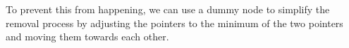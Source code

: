 \documentclass[preview]{standalone}
\begin{document}
To prevent this from happening, we can use a dummy node to simplify the removal process by adjusting the pointers to the minimum of the two pointers and moving them towards each other.\\
\end{document}
